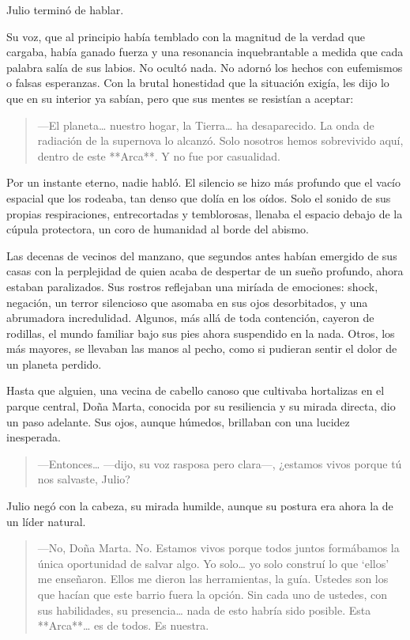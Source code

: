\documentclass[a4paper,12pt]{book}
\begin{document}
Julio terminó de hablar.

Su voz, que al principio había temblado con la magnitud de la verdad que cargaba, había ganado fuerza y una resonancia inquebrantable a medida que cada palabra salía de sus labios. No ocultó nada. No adornó los hechos con eufemismos o falsas esperanzas. Con la brutal honestidad que la situación exigía, les dijo lo que en su interior ya sabían, pero que sus mentes se resistían a aceptar:

\begin{quote}
    —El planeta… nuestro hogar, la Tierra… ha desaparecido. La onda de radiación de la supernova lo alcanzó. Solo nosotros hemos sobrevivido aquí, dentro de este **Arca**. Y no fue por casualidad.
\end{quote}

Por un instante eterno, nadie habló. El silencio se hizo más profundo que el vacío espacial que los rodeaba, tan denso que dolía en los oídos. Solo el sonido de sus propias respiraciones, entrecortadas y temblorosas, llenaba el espacio debajo de la cúpula protectora, un coro de humanidad al borde del abismo.

Las decenas de vecinos del manzano, que segundos antes habían emergido de sus casas con la perplejidad de quien acaba de despertar de un sueño profundo, ahora estaban paralizados. Sus rostros reflejaban una miríada de emociones: shock, negación, un terror silencioso que asomaba en sus ojos desorbitados, y una abrumadora incredulidad. Algunos, más allá de toda contención, cayeron de rodillas, el mundo familiar bajo sus pies ahora suspendido en la nada. Otros, los más mayores, se llevaban las manos al pecho, como si pudieran sentir el dolor de un planeta perdido.

Hasta que alguien, una vecina de cabello canoso que cultivaba hortalizas en el parque central, Doña Marta, conocida por su resiliencia y su mirada directa, dio un paso adelante. Sus ojos, aunque húmedos, brillaban con una lucidez inesperada.

\begin{quote}
    —Entonces… —dijo, su voz rasposa pero clara—, ¿estamos vivos porque tú nos salvaste, Julio?
\end{quote}

Julio negó con la cabeza, su mirada humilde, aunque su postura era ahora la de un líder natural.

\begin{quote}
    —No, Doña Marta. No. Estamos vivos porque todos juntos formábamos la única oportunidad de salvar algo. Yo solo… yo solo construí lo que ‘ellos’ me enseñaron. Ellos me dieron las herramientas, la guía. Ustedes son los que hacían que este barrio fuera la opción. Sin cada uno de ustedes, con sus habilidades, su presencia… nada de esto habría sido posible. Esta **Arca**… es de todos. Es nuestra.
\end{quote}
\end{document}
